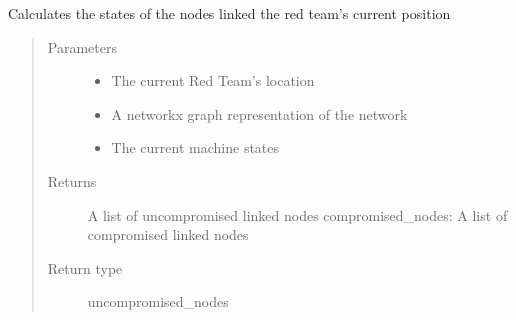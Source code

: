 \documentclass[letterpaper,10pt,english]{sphinxmanual}
\begin{document}
\begin{fulllineitems}
\label{\detokenize{source/yawning_titan.envs.specific.core:yawning_titan.envs.specific.core.node_states.get_linked_node_state}}
\sphinxAtStartPar
Calculates the states of the nodes linked the red team’s current position
\begin{quote}\begin{description}
\item[{Parameters}] \leavevmode\begin{itemize}
\item {}
\sphinxAtStartPar
{} \textendash{} The current Red Team’s location

\item {}
\sphinxAtStartPar
{} \textendash{} A networkx graph representation of the network

\item {}
\sphinxAtStartPar
{} \textendash{} The current machine states

\end{itemize}

\item[{Returns}] \leavevmode
\sphinxAtStartPar
A list of uncompromised linked nodes
compromised\_nodes: A list of compromised linked nodes

\item[{Return type}] \leavevmode
\sphinxAtStartPar
uncompromised\_nodes

\end{description}\end{quote}

\end{fulllineitems}

\end{document}
